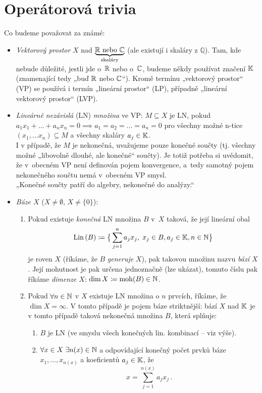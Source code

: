 \section{Operátorová trivia}

Co budeme považovat za známé:
\begin{itemize}
    \item \emph{Vektorový prostor} $X$ nad
    $\underbrace{\mathbb{R}\text{ nebo }\mathbb{C}}_{\text{skaláry}}$ (ale existují i skaláry z $\mathbb{Q}$). Tam, kde nebude důležité, jestli jde o~$\mathbb{R}$ nebo o~$\mathbb{C}$, budeme někdy používat značení $\mathbb{K}$ (znamenající tedy „buď $\mathbb{R}$ nebo $\mathbb{C}$“). Kromě termínu „vektorový prostor“ (VP) se používá i termín „lineární prostor“ (LP), případně „lineární vektorový prostor“ (LVP).
    
    \item \emph{Lineárně nezávislá} (LN) \emph{množina} ve VP: $M \subseteq X$ je LN, pokud $a_1 x_1 + \dots + a_n x_n = 0 \implies a_1 = a_2 = \dots = a_n = 0$ pro všechny možné n-tice $(x_1, \dots x_n) \subseteq M$ a všechny skaláry $a_j \in \mathbb{K}$.
    \\[5pt]
    \Poznamka I v případě, že $M$ je nekonečná, uvažujeme pouze konečné součty (tj. všechny možné „libovolně dlouhé, ale konečné“ součty). Je totiž potřeba si uvědomit, že v~obecném VP není definován pojem konvergence, a~tedy samotný pojem nekonečného součtu nemá v~obecném VP smysl.
    \\[5pt]
    „Konečné součty patří do algebry, nekonečné do analýzy.“
    
    \item \emph{Báze $X$} ($X \neq \emptyset$, $X \neq \{0\}$):
    \begin{enumerate}
        \item Pokud existuje \emph{konečná} LN množina $B$ v~$X$ taková, že její lineární obal
        $$ \operatorname{Lin}\,(B) \coloneqq \big\{ \sum_{j=1}^n a_j x_j, \;  x_j \in B, a_j \in \mathbb{K}, n \in \mathbb{N} \big\} $$
        je roven $X$ (říkáme, že $B$ \emph{generuje} $X$), pak takovou množinu nazvu \emph{bází $X$}.
        Její mohutnost je pak určena jednoznačně (lze ukázat), tomuto číslu pak říkáme \emph{dimenze $X$}: $\dim X \coloneqq \operatorname{moh}(B) \in \mathbb{N}$.
        \item Pokud $\forall n \in \mathbb{N}$ v $X$ existuje LN množina o $n$ prvcích, říkáme, že $\dim X = \infty$. V tomto případě je pojem báze striktnější: bází $X$ nad $\mathbb{K}$ je v tomto případě taková nekonečná množina $B$, která splňuje:
        \begin{enumerate}
            \item $B$ je LN (ve smyslu všech konečných lin. kombinací – viz výše).
            \item $\forall x \in X \; \exists n(x) \in \mathbb{N}$ a odpovídající konečný počet prvků báze $x_1, \dots,  x_{n(x)}$ a koeficientů $a_j \in \mathbb{K}$, že
            $$ x = \sum_{j=1}^{n(x)} a_j x_j \,. $$
        \end{enumerate}
        

\end{enumerate}
\end{itemize}
